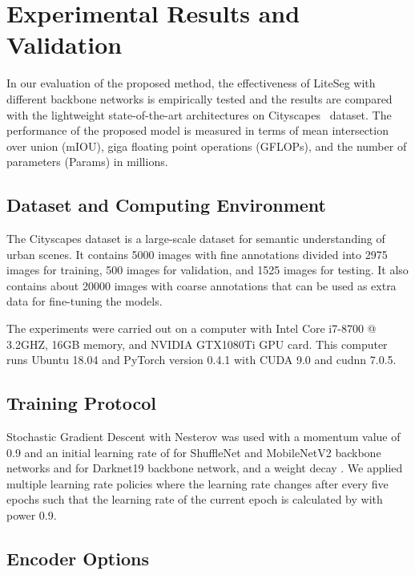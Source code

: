 \documentclass[conference,a4paper]{IEEEtran}
\begin{document}
\section{Experimental Results and Validation}
\label{sec:e1}
In our evaluation of the proposed method, the effectiveness of LiteSeg with different backbone networks is empirically tested and the results are compared with the lightweight state-of-the-art architectures on Cityscapes~\cite{dataset} dataset. The performance of the proposed model is measured in terms of mean intersection over union (mIOU), giga floating point operations (GFLOPs), and the number of parameters (Params) in millions.

\subsection{Dataset and Computing Environment}
\label{sec:e2}
The Cityscapes dataset is a large-scale dataset for semantic understanding of urban scenes. It contains 5000 images with fine annotations divided into 2975 images for training, 500 images for validation, and 1525 images for testing. It also contains about 20000 images with coarse annotations that can be used as extra data for fine-tuning the models. 

The experiments were carried out on a computer with Intel Core i7-8700 @ 3.2GHZ, 16GB memory, and NVIDIA GTX1080Ti GPU card. This computer runs Ubuntu 18.04 and PyTorch \cite{pytorch} version 0.4.1 with CUDA 9.0 and cudnn 7.0.5.

\subsection{Training Protocol}
\label{sec:e4}
Stochastic Gradient Descent with Nesterov \cite{momentum} was used with a momentum value of 0.9 and an initial learning rate of  for ShuffleNet and MobileNetV2 backbone networks and  for Darknet19 backbone network, and a weight decay . We applied multiple learning rate policies where the learning rate changes after every five epochs such that the learning rate of the current epoch is calculated by  with power 0.9.




\subsection{Encoder Options}
\label{sec:e5}
\end{document}
